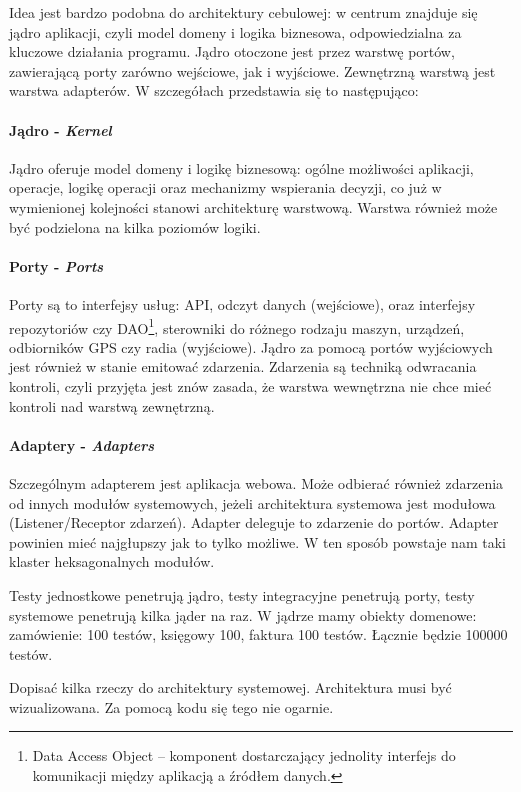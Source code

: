 Idea jest bardzo podobna do architektury cebulowej: w centrum znajduje się jądro aplikacji, czyli model domeny i logika biznesowa, odpowiedzialna za kluczowe działania programu. Jądro otoczone jest przez warstwę portów, zawierającą porty zarówno wejściowe, jak i wyjściowe. Zewnętrzną warstwą jest warstwa adapterów. W szczegółach przedstawia się to następująco:

\paragraph{Jądro - \textit{Kernel}}
Jądro oferuje model domeny i logikę biznesową: ogólne możliwości aplikacji, operacje, logikę operacji oraz mechanizmy wspierania decyzji, co już w wymienionej kolejności stanowi architekturę warstwową. Warstwa również może być podzielona na kilka poziomów logiki. 

\paragraph{Porty - \textit{Ports}}
Porty są to interfejsy usług: API, odczyt danych (wejściowe), oraz interfejsy repozytoriów czy DAO\footnote{Data Access Object – komponent dostarczający jednolity interfejs do komunikacji między aplikacją a źródłem danych.}, sterowniki do różnego rodzaju maszyn, urządzeń, odbiorników GPS czy radia (wyjściowe). Jądro za pomocą portów wyjściowych jest również w stanie emitować zdarzenia. Zdarzenia są techniką odwracania kontroli, czyli przyjęta jest znów zasada, że warstwa wewnętrzna nie chce mieć kontroli nad warstwą zewnętrzną. 

\paragraph{Adaptery - \textit{Adapters}}
Szczególnym adapterem jest aplikacja webowa. Może odbierać również zdarzenia od innych modułów systemowych, jeżeli architektura systemowa jest modułowa (Listener/Receptor zdarzeń). Adapter deleguje to zdarzenie do portów. Adapter powinien mieć najgłupszy jak to tylko możliwe. W ten sposób powstaje nam taki klaster heksagonalnych modułów.

Testy jednostkowe penetrują jądro, testy integracyjne penetrują porty, testy systemowe penetrują kilka jąder na raz. W jądrze mamy obiekty domenowe: zamówienie: 100 testów, księgowy 100, faktura 100 testów. Łącznie będzie 100000 testów.

Dopisać kilka rzeczy do architektury systemowej.
Architektura musi być wizualizowana. Za pomocą kodu się tego nie ogarnie. 

